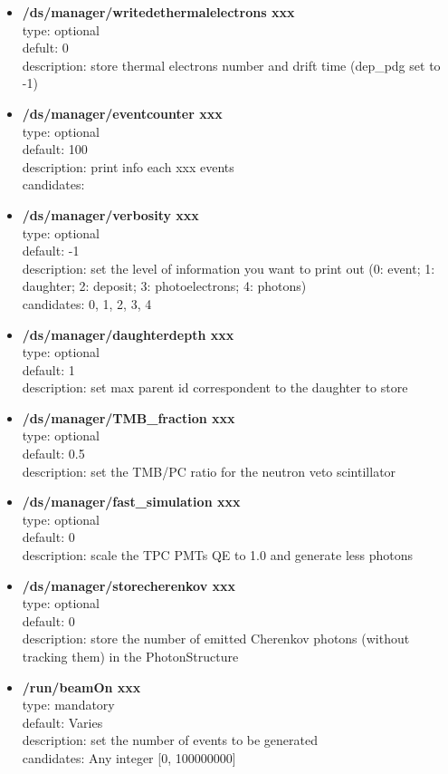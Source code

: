 \documentclass[twocolumn, 10pt]{article}
\begin{document}
\begin{itemize}
\item \textbf{/ds/manager/writedethermalelectrons xxx}\\
type: optional \\
defult: 0 \\ 
description: store thermal electrons number and drift time (dep\_pdg set to -1) \\

\item \textbf{/ds/manager/eventcounter xxx}\\
type: optional \\
default: 100 \\
description: print info each xxx events\\
candidates: \\

\item \textbf{/ds/manager/verbosity xxx}\\
type: optional \\
default: -1 \\
description: set the level of information you want to print out (0: event;
1: daughter; 2: deposit; 3: photoelectrons; 4: photons) \\
candidates: 0, 1, 2, 3, 4 \\


\item \textbf{/ds/manager/daughterdepth xxx}\\
type: optional \\
default: 1 \\
description: set max parent id correspondent to the daughter to store\\

\item \textbf{/ds/manager/TMB\_fraction  xxx}\\
type: optional \\
default: 0.5\\
description: set the TMB/PC ratio for the neutron veto scintillator

\item \textbf{/ds/manager/fast\_simulation  xxx}\\
type: optional \\
default: 0\\
description: scale the TPC PMTs QE to 1.0 and generate less photons

\item \textbf{/ds/manager/storecherenkov  xxx}\\
type: optional \\
default: 0\\
description: store the number of emitted Cherenkov photons (without tracking them) in the PhotonStructure

\item \textbf{/run/beamOn xxx}\\
type: mandatory\\
default: Varies \\
description: set the number of events to be generated\\
candidates: Any integer [0, 100000000]\\

\end{itemize}
\end{document}
